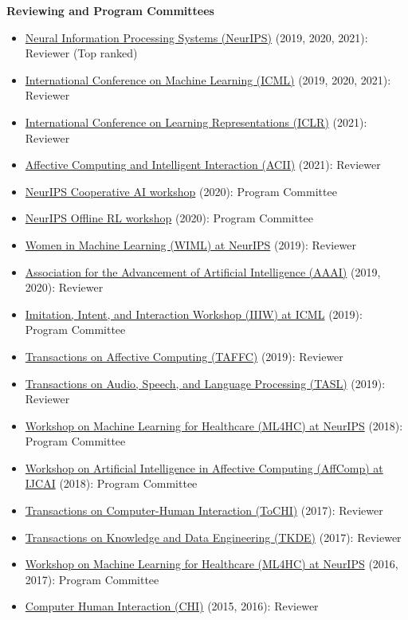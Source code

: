 \documentclass[paper=letter,fontsize=11pt]{scrartcl} %
\newcommand{\CommitteeEntry}[4]{
        \noindent \href{#4}{#1} (#2): #3}
\begin{document}
\noindent \textbf{Reviewing and Program Committees}
\begin{itemize}
    \item \CommitteeEntry{Neural Information Processing Systems (NeurIPS)}{2019, 2020, 2021}{Reviewer (Top ranked)}{}
    \item \CommitteeEntry{International Conference on Machine Learning (ICML)}{2019, 2020, 2021}{Reviewer}{}
    \item \CommitteeEntry{International Conference on Learning Representations (ICLR)}{2021}{Reviewer}{}
    \item \CommitteeEntry{Affective Computing and Intelligent Interaction (ACII)}{2021}{Reviewer}{}
    \item \CommitteeEntry{NeurIPS Cooperative AI workshop}{2020}{Program Committee}{}
    \item \CommitteeEntry{NeurIPS Offline RL workshop}{2020}{Program Committee}{}
    \item \CommitteeEntry{Women in Machine Learning (WIML) at NeurIPS}{2019}{Reviewer}{}
    \item \CommitteeEntry{Association for the Advancement of Artificial Intelligence (AAAI)}{2019, 2020}{Reviewer}{}
    \item \CommitteeEntry{Imitation, Intent, and Interaction Workshop (IIIW) at ICML}{2019}{Program Committee}{}
    \item \CommitteeEntry{Transactions on Affective Computing (TAFFC)}{2019}{Reviewer}{}
    \item \CommitteeEntry{Transactions on Audio, Speech, and Language Processing (TASL)}{2019}{Reviewer}{}
    \item \CommitteeEntry{Workshop on Machine Learning for Healthcare (ML4HC) at NeurIPS}{2018}{Program Committee}{}
    \item \CommitteeEntry{Workshop on Artificial Intelligence in Affective Computing (AffComp) at IJCAI}{2018}{Program Committee}{}
    \item \CommitteeEntry{Transactions on Computer-Human Interaction (ToCHI)}{2017}{Reviewer}{}
    \item \CommitteeEntry{Transactions on Knowledge and Data Engineering (TKDE)}{2017}{Reviewer}{}
    \item \CommitteeEntry{Workshop on Machine Learning for Healthcare (ML4HC) at NeurIPS}{2016, 2017}{Program Committee}{}
    \item \CommitteeEntry{Computer Human Interaction (CHI)}{2015, 2016}{Reviewer}{}

\end{itemize}
\end{document}
